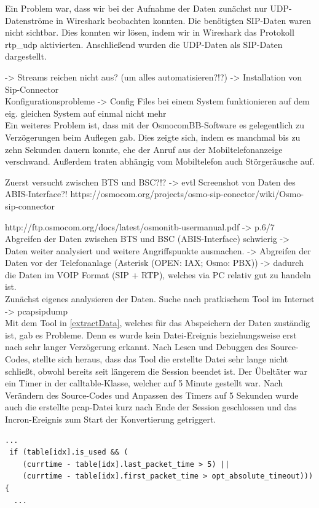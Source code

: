 Ein Problem war, dass wir bei der Aufnahme der Daten zunächst nur UDP-Datenströme in Wireshark beobachten konnten. Die benötigten SIP-Daten waren nicht sichtbar. Dies konnten wir lösen, indem wir in Wireshark das Protokoll rtp\_udp aktivierten. Anschließend wurden die UDP-Daten als SIP-Daten dargestellt.

 -> Streams reichen nicht aus? (um alles automatisieren?!?) -> Installation von Sip-Connector\\



Konfigurationsprobleme -> Config Files bei einem System funktionieren auf dem eig. gleichen System auf einmal nicht mehr\\



Ein weiteres Problem ist, dass mit der OsmocomBB-Software es gelegentlich zu Verzögerungen beim Auflegen gab. Dies zeigte sich, indem es manchmal bis zu zehn Sekunden dauern konnte, ehe der Anruf aus der Mobiltelefonanzeige verschwand. Außerdem traten abhängig vom Mobiltelefon auch Störgeräusche auf.



Zuerst versucht zwischen BTS und BSC?!?
-> evtl Screenshot von Daten des ABIS-Interface?!
https://osmocom.org/projects/osmo-sip-conector/wiki/Osmo-sip-connector

http://ftp.osmocom.org/docs/latest/osmonitb-usermanual.pdf -> p.6/7 \\

Abgreifen der Daten zwischen BTS und BSC (ABIS-Interface) schwierig -> Daten weiter analysiert und weitere Angriffspunkte ausmachen.
-> Abgreifen der Daten vor der Telefonanlage (Asterisk (OPEN: IAX; Osmo: PBX)) -> dadurch die Daten im VOIP Format (SIP + RTP), welches via PC relativ gut zu handeln ist. \\

Zunächst eigenes analysieren der Daten. Suche nach pratkischem Tool im Internet
-> pcapsipdump\\




Mit dem Tool in \ref{extractData}, welches für das Abspeichern der Daten zuständig ist, gab es Probleme. Denn es wurde kein Datei-Ereignis beziehungsweise erst nach sehr langer Verzögerung erkannt. Nach Lesen und Debuggen des Source-Codes, stellte sich heraus, dass das Tool die erstellte Datei sehr lange nicht schließt, obwohl bereits seit längerem die Session beendet ist. Der Übeltäter war ein Timer in der calltable-Klasse, welcher auf 5 Minute gestellt war. Nach Verändern des Source-Codes und Anpassen des Timers auf 5 Sekunden wurde auch die erstellte pcap-Datei kurz nach Ende der Session geschlossen und das Incron-Ereignis zum Start der Konvertierung getriggert.

\begin{lstlisting}[xleftmargin=.04\textwidth, firstnumber=211]
  ...
 if (table[idx].is_used && (
 	(currtime - table[idx].last_packet_time > 5) ||
    (currtime - table[idx].first_packet_time > opt_absolute_timeout))){
  ...
\end{lstlisting}
